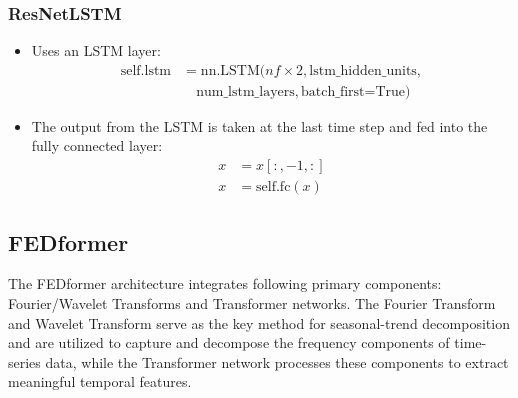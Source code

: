 \documentclass[conference]{IEEEtran}
\begin{document}
\begin{enumerate}
    \subsubsection{ResNetLSTM}
    \begin{itemize}
      \item Uses an LSTM layer: 
        \begin{align*}
          \text{self.lstm} &= \text{nn.LSTM}(nf \times 2, \text{lstm\_hidden\_units}, \\
                                          &\quad \text{num\_lstm\_layers}, \text{batch\_first=True})
        \end{align*}
      \item The output from the LSTM is taken at the last time step and fed into the fully connected layer: 
        \begin{align*}
          x &= x[:, -1, :]  \\ x &= \text{self.fc}(x)
        \end{align*}
    \end{itemize}

\end{enumerate}

\subsection{FEDformer}  
The FEDformer architecture integrates following primary components: Fourier/Wavelet Transforms and Transformer networks. The Fourier Transform and Wavelet Transform serve as the key method for seasonal-trend decomposition and are utilized to capture and decompose the frequency components of time-series data, while the Transformer network processes these components to extract meaningful temporal features.
\end{document}

